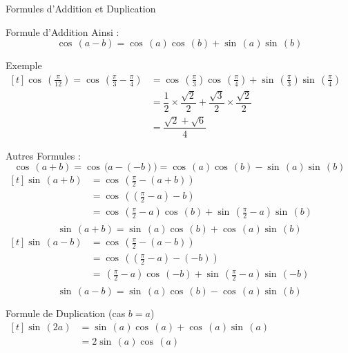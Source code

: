 \documentclass{coursbook}
\begin{document}
\begin{Gpartie}{Formules d'Addition et Duplication}
\begin{Spartie}{Formule d'Addition}
            Ainsi : \[\cos\,(a-b)=\cos\,(a)\cos\,(b)+\sin\,(a)\sin\,(b)\]
            \begin{SSpartie}{Exemple} 
                $\begin{aligned}[t]
                    \cos\,\left(\frac{\pi}{12}\right)=\cos\,\left(\frac{\pi}{3}-\frac{\pi}{4}\right) &= \cos\,\left(\frac{\pi}{3}\right)\cos\,\left(\frac{\pi}{4}\right)+\sin\,\left(\frac{\pi}{3}\right)\sin\,\left(\frac{\pi}{4}\right) \\
                    &= \dfrac{1}{2}\times\dfrac{\sqrt{2}}{2}+\dfrac{\sqrt{3}}{2}\times\dfrac{\sqrt{2}}{2} \\
                    &= \dfrac{\sqrt{2}+\sqrt{6}}{4}
                \end{aligned}$
            \end{SSpartie}
            Autres Formules :
            \[\cos\,(a+b)=\cos\,\big(a-(-b)\big)=\cos\,(a)\cos\,(b)-\sin\,(a)\sin\,(b)\]
            $\begin{aligned}[t]
                \sin\,(a+b) &= \cos\,\left(\frac{\pi}{2}-(a+b)\right) \\
                &= \cos\,\left(\left(\frac{\pi}{2}-a\right)-b\right) \\
                &= \cos\,\left(\frac{\pi}{2}-a\right)\cos\,(b)+\sin\,\left(\frac{\pi}{2}-a\right)\sin\,(b) \\
            \end{aligned}$
            \[\sin\,(a+b)=\sin\,(a)\cos\,(b)+\cos\,(a)\sin\,(b)\]
            $\begin{aligned}[t]
                \sin\,(a-b) &= \cos\,\left(\frac{\pi}{2}-(a-b)\right) \\
                &= \cos\,\left(\left(\frac{\pi}{2}-a\right)-(-b)\right) \\
                &= \,\left(\frac{\pi}{2}-a\right)\cos\,(-b)+\sin\,\left(\frac{\pi}{2}-a\right)\sin\,(-b) \\
            \end{aligned}$
            \[\sin\,(a-b)=\sin\,(a)\cos\,(b)-\cos\,(a)\sin\,(b)\]
        \end{Spartie}
        \begin{Spartie}{Formule de Duplication (cas $b=a$)} 
            $\begin{aligned}[t]
                \sin\,(2a) &= \sin\,(a)\cos\,(a)+\cos\,(a)\sin\,(a) \\
                &=2\sin\,(a)\cos\,(a)
            \end{aligned}$


\end{Spartie}
\end{Gpartie}
\end{document}
